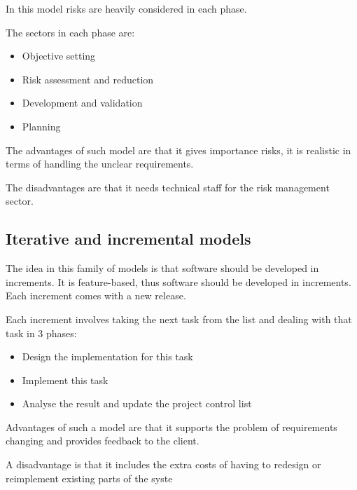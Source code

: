 \documentclass{article}
\begin{document}
	In this model risks are heavily considered in each phase.	
	
	The sectors in each phase are:
	\begin{itemize}
		\item Objective setting
		\item Risk assessment and reduction
		\item Development and validation
		\item Planning
	\end{itemize}
	
	The advantages of such model are that it gives importance risks, it is
	realistic in terms of handling the unclear requirements.	
	
	The disadvantages are that it needs technical staff for the risk management sector.
	
	\subsection*{Iterative and incremental models}	
	The idea in this family of models is that software should be developed in increments. 
	It is feature-based,
	thus software should be developed in increments. Each increment comes with a new release.
	
	Each increment involves taking the next task from the list and dealing with that task in 3 phases:
	\begin{itemize}
		\item Design the implementation for this task
		\item Implement this task
		\item Analyse the result and update the project control list
	\end{itemize}
	
	Advantages of such a model are that it supports the problem of requirements changing and provides feedback to
	the client.
	
	A disadvantage is that it includes the extra costs of having to redesign or reimplement existing parts of the syste
	
\end{document}
